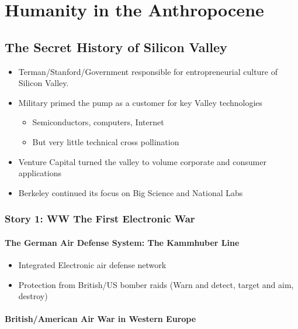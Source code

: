 \section{Humanity in the Anthropocene}

\subsection{The Secret History of Silicon Valley}

\begin{itemize}
    \item Terman/Stanford/Government responsible for entropreneurial culture
        of Silicon Valley.
    \item Military primed the pump as a customer for key Valley technologies
        \begin{itemize}
            \item Semiconductors, computers, Internet
            \item But very little technical cross pollination
        \end{itemize}
    \item Venture Capital turned the valley to volume corporate and consumer
        applications
    \item Berkeley continued its focus on Big Science and National Labs
\end{itemize}

\subsubsection{Story 1: WW The First Electronic War}

\paragraph{The German Air Defense System: The Kammhuber Line}

\begin{itemize}
    \item Integrated Electronic air defense network
    \item Protection from British/US bomber raids (Warn and detect, target
        and aim, destroy)
\end{itemize}

\paragraph{British/American Air War in Western Europe}

